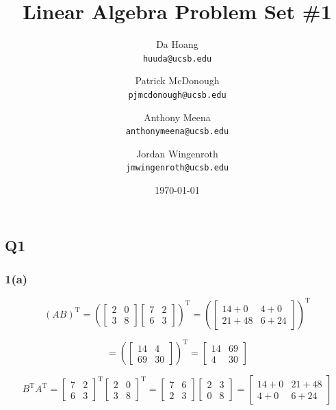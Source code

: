 \documentclass{article}
\author{Da Hoang \\ \texttt{huuda@ucsb.edu}\and Patrick McDonough\\\texttt{pjmcdonough@ucsb.edu}\and Anthony Meena\\\texttt{anthonymeena@ucsb.edu}\and Jordan Wingenroth\\\texttt{jmwingenroth@ucsb.edu}}
\title{Linear Algebra Problem Set \#1}
\date{\today}
\newcommand{\tp}{^{\mathrm T}}
\begin{document}
\maketitle

\subsection*{Q1}

\subsubsection*{1(a)}
\[
(AB)\tp = \left( \begin{bmatrix} 2 & 0 \\ 3 & 8 \end{bmatrix} \begin{bmatrix} 7 & 2 \\ 6 & 3 \end{bmatrix} \right)\tp
= \left( \begin{bmatrix} 14+0 & 4+0 \\ 21+48 & 6+24 \end{bmatrix} \right)\tp
\]

\[
= \left( \begin{bmatrix} 14 & 4 \\ 69 & 30 \end{bmatrix} \right)\tp
= \begin{bmatrix} 14 & 69 \\ 4 & 30 \end{bmatrix}
\]

\[
B\tp A\tp = \begin{bmatrix} 7 & 2 \\ 6 & 3 \end{bmatrix}\tp \begin{bmatrix} 2 & 0 \\ 3 & 8 \end{bmatrix}\tp
= \begin{bmatrix} 7 & 6 \\ 2 & 3 \end{bmatrix} \begin{bmatrix} 2 & 3 \\ 0 & 8 \end{bmatrix}
= \begin{bmatrix} 14+0 & 21+48 \\ 4+0 & 6+24 \end{bmatrix}
\]
\end{document}
